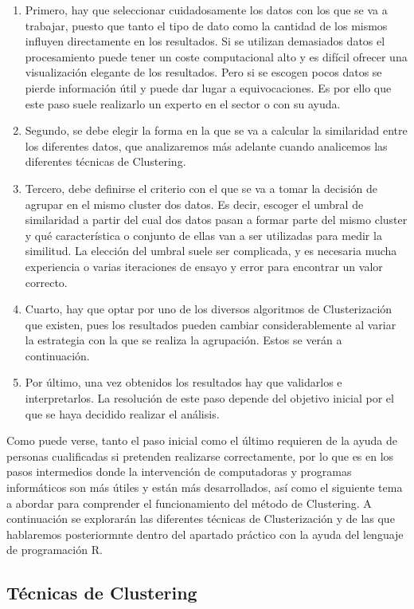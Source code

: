 \documentclass[3p,twocolumn]{elsarticle}
\begin{document}
\begin{enumerate}
\item Primero, hay que seleccionar cuidadosamente los datos con los que se va a trabajar, puesto que tanto el tipo de dato como la cantidad de los mismos influyen directamente en los resultados. Si se utilizan demasiados datos el procesamiento puede tener un coste computacional alto y es difícil ofrecer una visualización elegante de los resultados. Pero si se escogen pocos datos se pierde información útil y puede dar lugar a equivocaciones. Es por ello que este paso suele realizarlo un experto en el sector o con su ayuda. 
\item Segundo, se debe elegir la forma en la que se va a calcular la similaridad entre los diferentes datos, que analizaremos más adelante cuando analicemos las diferentes técnicas de Clustering.
\item Tercero, debe definirse el criterio con el que se va a tomar la decisión de agrupar en el mismo cluster dos datos. Es decir, escoger el umbral de similaridad a partir del cual dos datos pasan a formar parte del mismo cluster y qué característica o conjunto de ellas van a ser utilizadas para medir la similitud. La elección del umbral suele ser complicada, y es necesaria mucha experiencia o varias iteraciones de ensayo y error para encontrar un valor correcto.
\item Cuarto, hay que optar por uno de los diversos algoritmos de Clusterización que existen, pues los resultados pueden cambiar considerablemente al variar la estrategia con la que se realiza la agrupación. Estos se verán a continuación.
\item Por último, una vez obtenidos los resultados hay que validarlos e interpretarlos. La resolución de este paso depende del objetivo inicial por el que se haya decidido realizar el análisis.
\end{enumerate}

Como puede verse, tanto el paso inicial como el último requieren de la ayuda de personas cualificadas si pretenden realizarse correctamente, por lo que es en los pasos intermedios donde la intervención de computadoras y programas informáticos son más útiles y están más desarrollados, así como el siguiente tema a abordar para comprender el funcionamiento del método de Clustering. A continuación se explorarán las diferentes técnicas de Clusterización y de las que hablaremos posteriormnte dentro del apartado práctico con la ayuda del lenguaje de programación R.

\subsection{Técnicas de Clustering}
\end{document}
